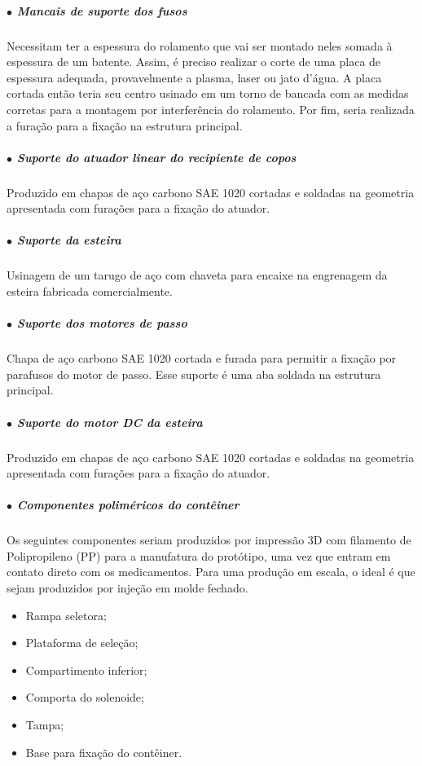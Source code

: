 \subparagraph*{$\bullet$ Mancais de suporte dos fusos} \hfill

Necessitam ter a espessura do rolamento que vai ser montado neles somada à espessura de um batente. Assim, é preciso realizar o corte de uma placa de espessura adequada, provavelmente a plasma, laser ou jato d'água. A placa cortada então teria seu centro usinado em um torno de bancada com as medidas corretas para a montagem por interferência do rolamento. Por fim, seria realizada a furação para a fixação na estrutura principal.

\subparagraph*{$\bullet$ Suporte do atuador linear do recipiente de copos} \hfill

Produzido em chapas de aço carbono SAE 1020 cortadas e soldadas na geometria apresentada com furações para a fixação do atuador.

\subparagraph*{$\bullet$ Suporte da esteira} \hfill  

Usinagem de um tarugo de aço com chaveta para encaixe na engrenagem da esteira fabricada comercialmente.

\subparagraph*{$\bullet$ Suporte dos motores de passo} \hfill 

Chapa de aço carbono SAE 1020 cortada e furada para permitir a fixação por parafusos do motor de passo. Esse suporte é uma aba soldada na estrutura principal.

\subparagraph*{$\bullet$ Suporte do motor DC da esteira} \hfill

Produzido em chapas de aço carbono SAE 1020 cortadas e soldadas na geometria apresentada com furações para a fixação do atuador.

\subparagraph*{$\bullet$ Componentes poliméricos do contêiner} \hfill 

Os seguintes componentes seriam produzidos por impressão 3D com filamento de Polipropileno (PP) para a manufatura do protótipo, uma vez que entram em contato direto com os medicamentos. Para uma produção em escala, o ideal é que sejam produzidos por injeção em molde fechado.

\begin{itemize}
    \item Rampa seletora;
    \item Plataforma de seleção;
    \item Compartimento inferior;
    \item Comporta do solenoide;
    \item Tampa;
    \item Base para fixação do contêiner.
\end{itemize}

